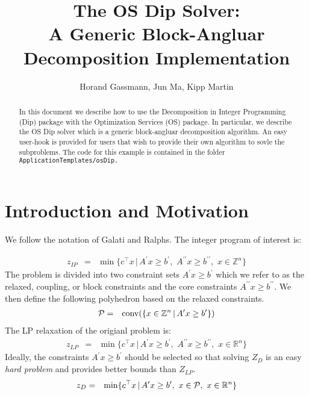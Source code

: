 \documentclass[11pt]{article}
\begin{document}
\title{The OS Dip Solver:\\
A Generic Block-Angluar Decomposition Implementation}
\vskip 2in
\author{Horand Gassmann, Jun Ma,  Kipp Martin}
\maketitle

\begin{abstract}
In this document we describe how to use the Decomposition in Integer Programming
(Dip) package with the Optimization Services (OS) package. In particular,  we
describe the OS Dip solver which is  a generic block-angluar
decomposition algorithm. An easy user-hook is provided for users that wish to
provide their own algorithm to sovle the subproblems.  The code for this example
is contained in the folder {\tt ApplicationTemplates/osDip.}




\end{abstract}


\newpage
{}


 

\newpage

\section{Introduction and Motivation}

We follow the notation of Galati and Ralphs. The integer program of interest is:

\begin{eqnarray}
z_{IP} &=&  \min  \{c^{\top} x \, | \, A^{\prime} x \ge b^{\prime},  \,\, 
A^{\prime \prime} x \ge b^{\prime \prime}, \, \, x \in \mathbb{Z}^{n}  \}
\end{eqnarray}
The problem is divided into two constraint sets $A^{\prime} x \ge b^{\prime}$
which we refer to as the relaxed, coupling, or block constraints and the core
constraints $A^{\prime \prime} x \ge b^{\prime \prime}.$  We then define the
following polyhedron based on the relaxed constraints.
\begin{eqnarray}
{\cal P} &=&  {\rm conv} ( \{ x \in \mathbb{Z}^{n} \, | \, A^{\prime} x \ge
b^{\prime}
\})
\end{eqnarray}
 The LP relaxation of the origianl problem is:
\begin{eqnarray}
z_{LP} &=&  \min  \{c^{\top} x \, | \, A^{\prime} x \ge b^{\prime},  \,\, 
A^{\prime \prime} x \ge b^{\prime \prime}, \, \, x \in \mathbb{R}^{n}  \}
\end{eqnarray}
Ideally,  the constraints $A^{\prime} x \ge b^{\prime}$
should be selected so that solving $Z_{D}$ is an easy {\it hard problem} and
provides better bounds than $Z_{LP}.$
\begin{eqnarray}
z_{D} &=&  \min  \{c^{\top} x \, | \, A^{\prime} x \ge b^{\prime},  \,\, 
x \in {\cal P}, \, \, x \in \mathbb{R}^{n}  \}
\end{eqnarray}
\end{document}
